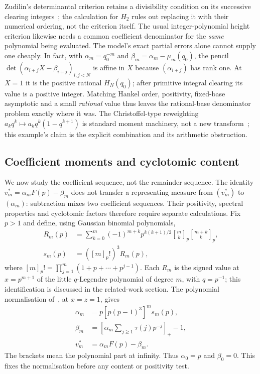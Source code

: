 \documentclass[11pt]{article}
\begin{document}
Zudilin's determinantal criterion retains a divisibility condition on
its successive clearing integers~\cite[Props.~1--2]{zudilin2017detv2};
the calculation for $H_2$ rules out replacing it with their numerical
ordering, not the criterion itself.  The usual integer-polynomial
height criterion likewise needs a common coefficient denominator for the
\emph{same} polynomial being evaluated.  The model's exact partial
errors alone cannot supply one cheaply.  In fact, with
$\alpha_m=q_0^{-m}$ and $\beta_m=\alpha_m-\mu_m(q_0)$, the pencil
$\det(\alpha_{i+j}X-\beta_{i+j})_{i,j<N}$ is affine in $X$ because
$(\alpha_{i+j})$ has rank one.  At $X=1$ it is the positive rational
$H_N(q_0)$; after primitive integral clearing its value is a positive
integer.  Matching Hankel order, positivity, fixed-base asymptotic and
a small \emph{rational} value thus leaves the rational-base denominator
problem exactly where it was.  The Christoffel-type reweighting
$a_kq^k\mapsto a_kq^k(1-q^{k+1})$ is standard moment machinery, not a
new transform~\cite[Intro., (3)--(4)]{kozhanvaktnas2024}; this example's claim is
the explicit combination and its arithmetic obstruction.

\subsection{Coefficient moments and cyclotomic content}
\label{long1049:sec:coefficient-questions}
We now study the coefficient sequence, not the remainder sequence.
The identity $v_m^*=\alpha_mF(p)-\beta_m$ does not transfer a
representing measure from $(v_m^*)$ to $(\alpha_m)$: subtraction
mixes two coefficient sequences. Their positivity, spectral
properties and cyclotomic factors therefore require separate
calculations. Fix $p>1$ and define, using Gaussian binomial
polynomials,
\[
 \begin{aligned}
 R_m(p)&=\sum_{k=0}^m(-1)^{m+k}p^{k(k+1)/2}
          \genfrac{[}{]}{0pt}{}{m}{k}_p\genfrac{[}{]}{0pt}{}{m+k}{k}_p,\\
 s_m(p)&=([m]_p!)^3R_m(p),
 \end{aligned}
\]
where $[m]_p!=\prod_{j=1}^m(1+p+\cdots+p^{j-1})$.
Each $R_m$ is the signed value at $x=p^{m+1}$ of the little
$q$-Legendre polynomial of degree $m$, with $q=p^{-1}$; this
identification is discussed in the related-work section.
The polynomial normalisation of~\cite[Sec.~3, p.~5]{zudilin2016}, at
$x=z=1$, gives
\[
 \begin{aligned}
 \alpha_m&=p[p(p-1)^3]^m s_m(p),\\
 \beta_m&=\left[\alpha_m\sum_{j\ge1}\tau(j)p^{-j}\right]_+-1,\\
 v_m^*&=\alpha_mF(p)-\beta_m.
 \end{aligned}
\]
The brackets mean the polynomial part at infinity. Thus
$\alpha_0=p$ and $\beta_0=0$. This fixes the normalisation before any
content or positivity test.
\end{document}
